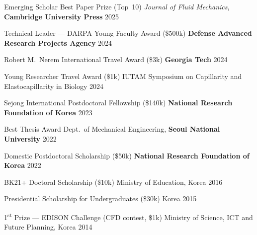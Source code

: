 
\begin{cvhonors}

  \cvhonor
    {Emerging Scholar Best Paper Prize (Top~10)}
    {\textit{Journal of Fluid Mechanics}, \textbf{Cambridge University Press}}
    {}
    {2025}

  \cvhonor
    {Technical Leader --- DARPA Young Faculty Award (\$500k)}
    {\textbf{Defense Advanced Research Projects Agency}}
    {}
    {2024}

  \cvhonor
    {Robert M.\ Nerem International Travel Award (\$3k)}
    {\textbf{Georgia Tech}}
    {}
    {2024}

  \cvhonor
    {Young Researcher Travel Award (\$1k)}
    {IUTAM Symposium on Capillarity and Elastocapillarity in Biology}
    {}
    {2024}

  \cvhonor
    {Sejong International Postdoctoral Fellowship (\$140k)}
    {\textbf{National Research Foundation of Korea}}
    {}
    {2023}

  \cvhonor
    {Best Thesis Award}
    {Dept.\ of Mechanical Engineering, \textbf{Seoul National University}}
    {}
    {2022}

  \cvhonor
    {Domestic Postdoctoral Scholarship (\$50k)}
    {\textbf{National Research Foundation of Korea}}
    {}
    {2022}

  \cvhonor
    {BK21+ Doctoral Scholarship (\$10k)}
    {Ministry of Education, Korea}
    {}
    {2016}

  \cvhonor
    {Presidential Scholarship for Undergraduates (\$30k)}
    {Korea}
    {}
    {2015}

  \cvhonor
    {1\textsuperscript{st} Prize --- EDISON Challenge (CFD contest, \$1k)}
    {Ministry of Science, ICT and Future Planning, Korea}
    {}
    {2014}

\end{cvhonors}
